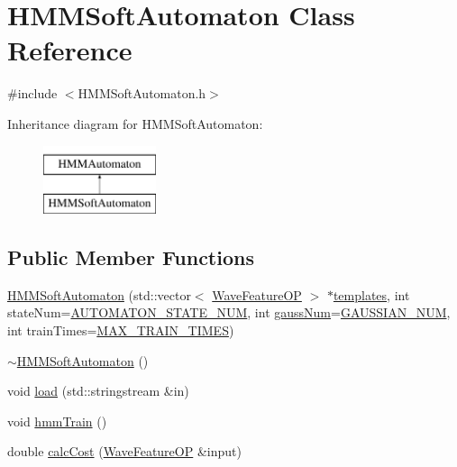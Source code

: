 \hypertarget{class_h_m_m_soft_automaton}{\section{H\+M\+M\+Soft\+Automaton Class Reference}
\label{class_h_m_m_soft_automaton}
}


{\ttfamily \#include $<$H\+M\+M\+Soft\+Automaton.\+h$>$}

Inheritance diagram for H\+M\+M\+Soft\+Automaton\+:\begin{figure}[H]
\begin{center}
\leavevmode
\includegraphics[height=2.000000cm]{class_h_m_m_soft_automaton}
\end{center}
\end{figure}
\subsection*{Public Member Functions}
\begin{DoxyCompactItemize}
\item 
\hyperlink{class_h_m_m_soft_automaton_aaf1234269846de3e87b3e02991768874}{H\+M\+M\+Soft\+Automaton} (std\+::vector$<$ \hyperlink{class_wave_feature_o_p}{Wave\+Feature\+O\+P} $>$ $\ast$\hyperlink{class_h_m_m_automaton_a9932eb5aa8ff484ac2406f98498595cf}{templates}, int state\+Num=\hyperlink{configure__hmm_8h_aa9cc71cb42394379957677c761aae79e}{A\+U\+T\+O\+M\+A\+T\+O\+N\+\_\+\+S\+T\+A\+T\+E\+\_\+\+N\+U\+M}, int \hyperlink{pro6__demo_8cpp_a923ffcfa3c56ccdba17bc4e700247d54}{gauss\+Num}=\hyperlink{configure__hmm_8h_a8f9db0624fff0b17f641785bb8d66a82}{G\+A\+U\+S\+S\+I\+A\+N\+\_\+\+N\+U\+M}, int train\+Times=\hyperlink{configure__hmm_8h_a52e22519b5a37e58632e9183d5197b86}{M\+A\+X\+\_\+\+T\+R\+A\+I\+N\+\_\+\+T\+I\+M\+E\+S})
\item 
\hyperlink{class_h_m_m_soft_automaton_a3a16b05052259ed3ee1fcf7e12fb343a}{$\sim$\+H\+M\+M\+Soft\+Automaton} ()
\item 
void \hyperlink{class_h_m_m_soft_automaton_ac99d24cfbfa563c54a6ee7c68b36d37e}{load} (std\+::stringstream \&in)
\item 
void \hyperlink{class_h_m_m_soft_automaton_a06c50e4f7a3461a6c6737cbe077ca0d0}{hmm\+Train} ()
\item 
double \hyperlink{class_h_m_m_soft_automaton_a4efa065f2e067d9e0b71bbf4a25bd120}{calc\+Cost} (\hyperlink{class_wave_feature_o_p}{Wave\+Feature\+O\+P} \&input)
\end{DoxyCompactItemize}
